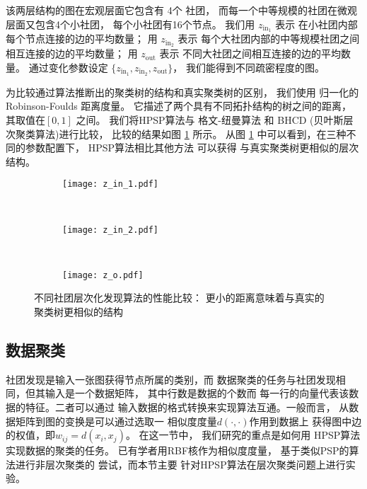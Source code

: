 该两层结构的图在宏观层面它包含有 4个 社团，
而每一个中等规模的社团在微观层面又包含4个小社团，
每个小社团有16个节点。
我们用 $z_{\mathrm{in}_1}$ 表示
在小社团内部每个节点连接的边的平均数量；
用 $z_{\mathrm{in}_2}$ 表示
每个大社团内部的中等规模社团之间相互连接的边的平均数量；
用 $z_{\mathrm{out}}$ 表示
不同大社团之间相互连接的边的平均数量。
通过变化参数设定
$\{z_{\mathrm{in}_1}, z_{\mathrm{in}_2}, z_{\mathrm{out}} \}$，
我们能得到不同疏密程度的图。

为比较通过算法推断出的聚类树的结构和真实聚类树的区别，
我们使用 归一化的 Robinson-Foulds 距离度量\cite{ROBINSON1981131}。
它描述了两个具有不同拓扑结构的树之间的距离，
其取值在$[0,1]$ 之间。
我们将HPSP算法与
格文-纽曼算法\cite{girvan2002community}
和 BHCD (贝叶斯层次聚类算法\cite{blundell2013bhcd})进行比较，
比较的结果如图 \ref{fig:cdr} 所示。
从图 \ref{fig:cdr} 中可以看到，在三种不同的参数配置下，
HPSP算法相比其他方法 可以获得
与真实聚类树更相似的层次结构。

\begin{figure}
	\centering
	\begin{subfigure}{0.33\textwidth}
		\texttt{[image: z\_in\_1.pdf]}
		\caption{}
	\end{subfigure}~
	\begin{subfigure}{0.33\textwidth}
		\texttt{[image: z\_in\_2.pdf]}
		\caption{}
	\end{subfigure}~
	\begin{subfigure}{0.33\textwidth}
		\texttt{[image: z\_o.pdf]}
		\caption{}
	\end{subfigure}
	\caption{不同社团层次化发现算法的性能比较：
  更小的距离意味着与真实的聚类树更相似的结构}
  \label{fig:cdr}
\end{figure}

\subsection{数据聚类}
\label{sec:data_clustering}
社团发现是输入一张图获得节点所属的类别，而
数据聚类的任务与社团发现相同，但其输入是一个数据矩阵，
其中行数是数据的个数而
每一行的向量代表该数据的特征。二者可以通过
输入数据的格式转换来实现算法互通。一般而言，
从数据矩阵到图的变换是可以通过选取一
相似度度量$d(\cdot,\cdot)$作用到数据上
获得图中边的权值，即$w_{ij}=d(x_i, x_j)$。
在这一节中，
我们研究的重点是如何用
HPSP算法 实现数据的聚类的任务。
已有学者用RBF核作为相似度度量，
基于类似PSP的算法进行非层次聚类的
尝试\cite{mac}，而本节主要
针对HPSP算法在层次聚类问题上进行实验。

